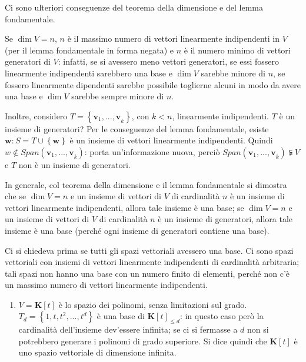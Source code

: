 \documentclass{article}
\begin{document}
Ci sono ulteriori conseguenze del teorema della dimensione e del lemma
fondamentale.

Se $\dim V=n$, $n$ \`{e} il massimo numero di vettori linearmente
indipendenti in $V$ (per il lemma fondamentale in forma negata) e $n$ \`{e}
il numero minimo di vettori generatori di $V$: infatti, se si avessero meno
vettori generatori, se essi fossero linearmente indipendenti sarebbero una
base e $\dim V$ sarebbe minore di $n$, se fossero linearmente dipendenti
sarebbe possibile toglierne alcuni in modo da avere una base e $\dim V$
sarebbe sempre minore di $n$.

Inoltre, considero $T=\left\{ \mathbf{v}_{1}\mathbf{,...,v}_{k}\right\} $,
con $k<n$, linearmente indipendenti. $T$ \`{e} un insieme di generatori? Per
le conseguenze del lemma fondamentale, esiste $\mathbf{w}:S=T\cup \left\{ 
\mathbf{w}\right\} $ \`{e} un insieme di vettori linearmente indipendenti.
Quindi $w\notin Span\left( \mathbf{v}_{1}\mathbf{,...,v}_{k}\right) $: porta
un'informazione nuova, perci\`{o} $Span\left( \mathbf{v}_{1}\mathbf{,...,v}%
_{k}\right) \subsetneqq V$ e $T$ non \`{e} un insieme di generatori.

In generale, col teorema della dimensione e il lemma fondamentale si
dimostra che se $\dim V=n$ e un insieme di vettori di $V$ di cardinalit\`{a} 
$n$ \`{e} un insieme di vettori linearmente indipendenti, allora tale
insieme \`{e} una base; se $\dim V=n$ e un insieme di vettori di $V$ di
cardinalit\`{a} $n$ \`{e} un insieme di generatori, allora tale insieme \`{e}
una base (perch\'{e} ogni insieme di generatori contiene una base).

Ci si chiedeva prima se tutti gli spazi vettoriali avessero una base. Ci
sono spazi vettoriali con insiemi di vettori linearmente indipendenti di
cardinalit\`{a} arbitraria; tali spazi non hanno una base con un numero
finito di elementi, perch\'{e} non c'\`{e} un massimo numero di vettori
linearmente indipendenti.

\begin{enumerate}
\item $V=\mathbf{K}\left[ t\right] $ \`{e} lo spazio dei polinomi, senza
limitazioni sul grado. $T_{d}=\left\{ 1,t,t^{2},...,t^{d}\right\} $ \`{e}
una base di $\mathbf{K}\left[ t\right] _{\leq d}$: in questo caso per\`{o}
la cardinalit\`{a} dell'insieme dev'essere infinita; se ci si fermasse a $d$
non si potrebbero generare i polinomi di grado superiore. Si dice quindi che 
$\mathbf{K}\left[ t\right] $ \`{e} uno spazio vettoriale di dimensione
infinita.
\end{enumerate}
\end{document}
